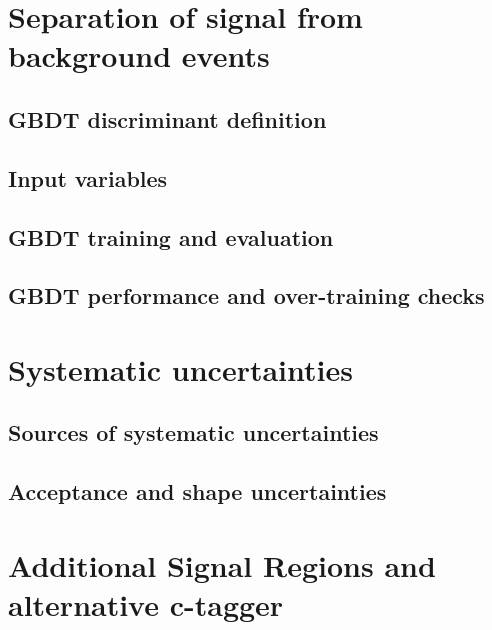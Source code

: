 \clearpage
\section{Separation of signal from background events}
\label{sec:separation}
\clearpage
\subsection {GBDT discriminant definition}
\clearpage
\subsection {Input variables}
\clearpage
\subsection {GBDT training and evaluation}
\clearpage
\subsection {GBDT performance and over-training checks }


\clearpage
\section{Systematic uncertainties}
\clearpage
\subsection {Sources of systematic uncertainties}
\clearpage
\subsection {Acceptance and shape uncertainties}

\clearpage
\section {Additional Signal Regions and alternative c-tagger}
\label{sec:other_selection}
\clearpage


